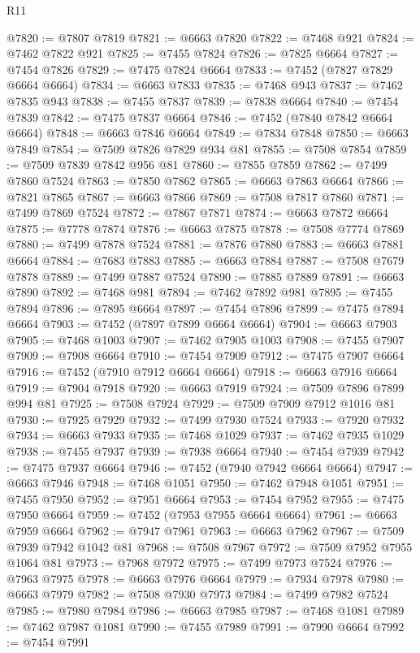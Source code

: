 \begin{lexlean}{R11}
\begin{coremodule}
@7820 := @7807 @7819
@7821 := @6663 @7820
@7822 := @7468 @921
@7824 := @7462 @7822 @921
@7825 := @7455 @7824
@7826 := @7825 @6664
@7827 := @7454 @7826
@7829 := @7475 @7824 @6664
@7833 := @7452 (@7827 @7829 @6664 @6664)
@7834 := @6663 @7833
@7835 := @7468 @943
@7837 := @7462 @7835 @943
@7838 := @7455 @7837
@7839 := @7838 @6664
@7840 := @7454 @7839
@7842 := @7475 @7837 @6664
@7846 := @7452 (@7840 @7842 @6664 @6664)
@7848 := @6663 @7846 @6664
@7849 := @7834 @7848
@7850 := @6663 @7849
@7854 := @7509 @7826 @7829 @934 @81
@7855 := @7508 @7854
@7859 := @7509 @7839 @7842 @956 @81
@7860 := @7855 @7859
@7862 := @7499 @7860 @7524
@7863 := @7850 @7862
@7865 := @6663 @7863 @6664
@7866 := @7821 @7865
@7867 := @6663 @7866
@7869 := @7508 @7817 @7860
@7871 := @7499 @7869 @7524
@7872 := @7867 @7871
@7874 := @6663 @7872 @6664
@7875 := @7778 @7874
@7876 := @6663 @7875
@7878 := @7508 @7774 @7869
@7880 := @7499 @7878 @7524
@7881 := @7876 @7880
@7883 := @6663 @7881 @6664
@7884 := @7683 @7883
@7885 := @6663 @7884
@7887 := @7508 @7679 @7878
@7889 := @7499 @7887 @7524
@7890 := @7885 @7889
@7891 := @6663 @7890
@7892 := @7468 @981
@7894 := @7462 @7892 @981
@7895 := @7455 @7894
@7896 := @7895 @6664
@7897 := @7454 @7896
@7899 := @7475 @7894 @6664
@7903 := @7452 (@7897 @7899 @6664 @6664)
@7904 := @6663 @7903
@7905 := @7468 @1003
@7907 := @7462 @7905 @1003
@7908 := @7455 @7907
@7909 := @7908 @6664
@7910 := @7454 @7909
@7912 := @7475 @7907 @6664
@7916 := @7452 (@7910 @7912 @6664 @6664)
@7918 := @6663 @7916 @6664
@7919 := @7904 @7918
@7920 := @6663 @7919
@7924 := @7509 @7896 @7899 @994 @81
@7925 := @7508 @7924
@7929 := @7509 @7909 @7912 @1016 @81
@7930 := @7925 @7929
@7932 := @7499 @7930 @7524
@7933 := @7920 @7932
@7934 := @6663 @7933
@7935 := @7468 @1029
@7937 := @7462 @7935 @1029
@7938 := @7455 @7937
@7939 := @7938 @6664
@7940 := @7454 @7939
@7942 := @7475 @7937 @6664
@7946 := @7452 (@7940 @7942 @6664 @6664)
@7947 := @6663 @7946
@7948 := @7468 @1051
@7950 := @7462 @7948 @1051
@7951 := @7455 @7950
@7952 := @7951 @6664
@7953 := @7454 @7952
@7955 := @7475 @7950 @6664
@7959 := @7452 (@7953 @7955 @6664 @6664)
@7961 := @6663 @7959 @6664
@7962 := @7947 @7961
@7963 := @6663 @7962
@7967 := @7509 @7939 @7942 @1042 @81
@7968 := @7508 @7967
@7972 := @7509 @7952 @7955 @1064 @81
@7973 := @7968 @7972
@7975 := @7499 @7973 @7524
@7976 := @7963 @7975
@7978 := @6663 @7976 @6664
@7979 := @7934 @7978
@7980 := @6663 @7979
@7982 := @7508 @7930 @7973
@7984 := @7499 @7982 @7524
@7985 := @7980 @7984
@7986 := @6663 @7985
@7987 := @7468 @1081
@7989 := @7462 @7987 @1081
@7990 := @7455 @7989
@7991 := @7990 @6664
@7992 := @7454 @7991

\end{coremodule}
\end{lexlean}
